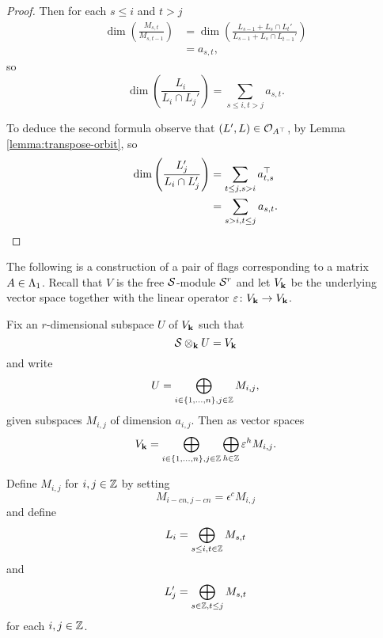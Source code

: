 \documentclass[a4paper, 11pt]{report}
\begin{document}
\begin{proof}
Then for each $s\le i$ and $t>j$
\begin{align*}
\dim\left(\frac{M_{s,t}}{M_{s,t-1}}\right)
&= \dim\left(\frac{L_{s-1} + L_s\cap L_t'}{L_{s-1} + L_s\cap L_{t-1}'}\right)\\
&= a_{s,t},
\end{align*}
so
\begin{equation*}
\dim\left(\frac{L_i}{L_i\cap L_j'}\right) = \sum_{s\le i, t>j} a_{s,t}.
\end{equation*}

To deduce the second formula observe that $(L',L)\in\mathcal{O}_{A^\top}$, by Lemma \ref{lemma:transpose-orbit}, so
\begin{align*}
\dim\left(\frac{L_j'}{L_i\cap L_j'}\right)
&= \sum_{t\le j, s>i} a_{t,s}^\top\\
&= \sum_{s>i, t\le j} a_{s,t}.
\end{align*}
\end{proof}

The following is a construction of a pair of flags corresponding to a matrix $A\in\Lambda_1{}$. Recall that $V$ is the free $\mathcal{S}$-module $\mathcal{S}^r$ and let $V_{\mathbf{k}}$ be the underlying vector space together with the linear operator $\varepsilon\colon V_{\mathbf{k}}\to V_{\mathbf{k}}$.

Fix an $r$-dimensional subspace $U$ of $V_{\mathbf{k}}$ such that
\begin{equation*}
\mathcal{S}\otimes_{\mathbf{k}}U = V_{\mathbf{k}}
\end{equation*}
and write
\begin{equation*}
U = \bigoplus_{i\in\{1,\ldots,n\},j\in\mathbb{Z}} M_{i,j},
\end{equation*}
given subspaces $M_{i,j}$ of dimension $a_{i,j}$. Then as vector spaces
\begin{equation*}
V_{\mathbf{k}} = \bigoplus_{i\in\{1,\ldots,n\},j\in\mathbb{Z}}\bigoplus_{h\in\mathbb{Z}} \varepsilon^hM_{i,j}.
\end{equation*}

Define $M_{i,j}$ for $i,j\in\mathbb{Z}$ by setting
\begin{equation*}
M_{i-cn,j-cn} = \epsilon^c M_{i,j}
\end{equation*}
and define
\begin{equation*}
L_i = \bigoplus_{s\le i, t\in\mathbb{Z}} M_{s,t}
\end{equation*}
and
\begin{equation*}
L_j' = \bigoplus_{s\in\mathbb{Z}, t\le j} M_{s,t}
\end{equation*}
for each $i,j\in\mathbb{Z}$.
\end{document}
